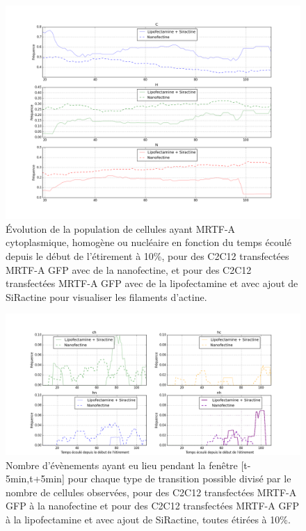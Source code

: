 \documentclass                                                                                                                                                                                                                                                                                                                                       {report}
\begin{document}
\begin{figure}[p]
\includegraphics[scale=0.3]{Figures/Et10_Siractine_comparaison.png}
\caption{\'Evolution de la population de cellules ayant MRTF-A cytoplasmique, homogène ou nucléaire en fonction du temps écoulé depuis le début de l'étirement à 10\%, pour des C2C12 transfectées MRTF-A GFP avec de la nanofectine, et pour des C2C12 transfectées MRTF-A GFP avec de la lipofectamine et avec ajout de SiRactine pour visualiser les filaments d'actine. \label{CHN_SiR}}
\end{figure}

\begin{figure}[p]
\includegraphics[scale=0.3]{Figures/Et10_transloc_Siractine.png} 
\caption{Nombre d'évènements ayant eu lieu pendant la fenêtre [t-5min,t+5min] pour chaque type de transition possible divisé par le nombre de cellules observées, pour des C2C12 transfectées MRTF-A GFP à la nanofectine et pour des C2C12 transfectées MRTF-A GFP à la lipofectamine et avec ajout de SiRactine, toutes étirées à 10\%. \label{transloc_Sir}}
\end{figure}
\end{document}
